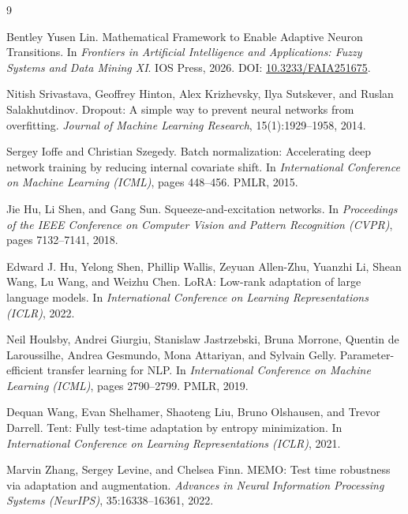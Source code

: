 \documentclass[11pt,a4paper]{article}
\theoremstyle{definition}
\begin{document}
\begin{thebibliography}{9}

Bentley Yusen Lin.
Mathematical Framework to Enable Adaptive Neuron Transitions.
In \textit{Frontiers in Artificial Intelligence and Applications: Fuzzy Systems and Data Mining XI}. IOS Press, 2026.
DOI: \href{https://doi.org/10.3233/FAIA251675}{10.3233/FAIA251675}.

Nitish Srivastava, Geoffrey Hinton, Alex Krizhevsky, Ilya Sutskever, and Ruslan Salakhutdinov.
Dropout: A simple way to prevent neural networks from overfitting.
\textit{Journal of Machine Learning Research}, 15(1):1929--1958, 2014.

Sergey Ioffe and Christian Szegedy.
Batch normalization: Accelerating deep network training by reducing internal covariate shift.
In \textit{International Conference on Machine Learning (ICML)}, pages 448--456. PMLR, 2015.

Jie Hu, Li Shen, and Gang Sun.
Squeeze-and-excitation networks.
In \textit{Proceedings of the IEEE Conference on Computer Vision and Pattern Recognition (CVPR)}, pages 7132--7141, 2018.

Edward J. Hu, Yelong Shen, Phillip Wallis, Zeyuan Allen-Zhu, Yuanzhi Li, Shean Wang, Lu Wang, and Weizhu Chen.
LoRA: Low-rank adaptation of large language models.
In \textit{International Conference on Learning Representations (ICLR)}, 2022.

Neil Houlsby, Andrei Giurgiu, Stanislaw Jastrzebski, Bruna Morrone, Quentin de Laroussilhe, Andrea Gesmundo, Mona Attariyan, and Sylvain Gelly.
Parameter-efficient transfer learning for NLP.
In \textit{International Conference on Machine Learning (ICML)}, pages 2790--2799. PMLR, 2019.

Dequan Wang, Evan Shelhamer, Shaoteng Liu, Bruno Olshausen, and Trevor Darrell.
Tent: Fully test-time adaptation by entropy minimization.
In \textit{International Conference on Learning Representations (ICLR)}, 2021.

Marvin Zhang, Sergey Levine, and Chelsea Finn.
MEMO: Test time robustness via adaptation and augmentation.
\textit{Advances in Neural Information Processing Systems (NeurIPS)}, 35:16338--16361, 2022.


\end{thebibliography}
\end{document}
